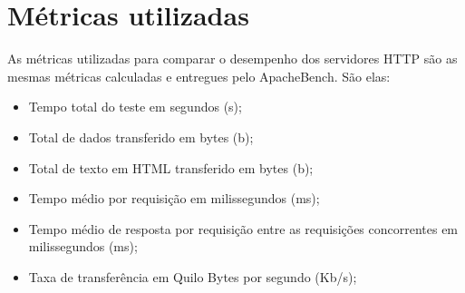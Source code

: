 \section{Métricas utilizadas}
As métricas utilizadas para comparar o desempenho dos servidores HTTP são as 
mesmas métricas calculadas e entregues pelo ApacheBench. São elas:
\begin{itemize}
	\item Tempo total do teste em segundos (s);
	\item Total de dados transferido em bytes (b);
	\item Total de texto em HTML transferido em bytes (b);
	\item Tempo médio por requisição em milissegundos (ms);
	\item Tempo médio de resposta por requisição entre as requisições 
	concorrentes em milissegundos (ms);
	\item Taxa de transferência em Quilo Bytes por segundo (Kb/s);
\end{itemize}